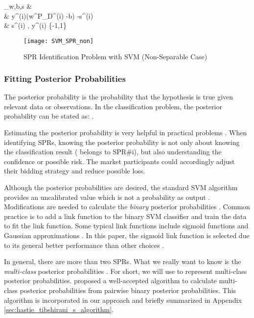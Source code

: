 \documentclass[letterpaper, 11pt]{article}
\theoremstyle{plain}
\theoremstyle{definition}
\begin{document}
  \min_{w,b,s} &  \label{eqn:non_sep_SVM_obj} \\ 
   & \qquad y^{(i)}(w^\intercal  P_D^{(i)} -b) -s^{(i)} \label{eqn:non_sep_SVM_cons} \\
 			 & \qquad s^{(i)} , y^{(i)} \in \{-1,1\} \nonumber	

\begin{figure}[htbp]
  \centering
  \texttt{[image: SVM\_SPR\_non]}
  \caption{SPR Identification Problem with SVM (Non-Separable Case)}
  \label{fig:SVM_SPR_non}
\end{figure}





\subsubsection{Fitting Posterior Probabilities} \label{ssub:fitting_posterior_probabilities}

The posterior probability is the probability that the hypothesis is true given relevant data or observations.
In the classification problem, the posterior probability can be stated as: .

Estimating the posterior probability is very helpful in practical problems \cite{Platt1999}. 
When identifying SPRs, knowing the posterior probability  is not only about knowing the classification result  ( belongs to SPR\#i), but also understanding the confidence or possible risk. The market participants could accordingly adjust their bidding strategy and reduce possible loss.

Although the posterior probabilities are desired, the standard SVM algorithm provides an uncalibrated value which is not a probability as output \cite{Platt1999}. Modifications are needed to calculate the \emph{binary} posterior probabilities . 
Common practice is to add a link function to the binary SVM classifier and train the data to fit the link function. Some typical link functions include sigmoid functions \cite{Platt1999} and Gaussian approximations \cite{hastie1998classification}. In this paper, the sigmoid link function is selected due to its general better performance than other choices \cite{Platt1999}. 

In general, there are more than two SPRs. What we really want to know is the \emph{multi-class} posterior probabilities . For short, we will use  to represent multi-class posterior probabilities. \cite{hastie1998classification} proposed a well-accepted algorithm to calculate multi-class posterior probabilities from pairwise binary posterior probabilities. This algorithm is incorporated in our approach and briefly summarized in Appendix \ref{sec:hastie_tibshirani_s_algorithm}.
\end{document}
